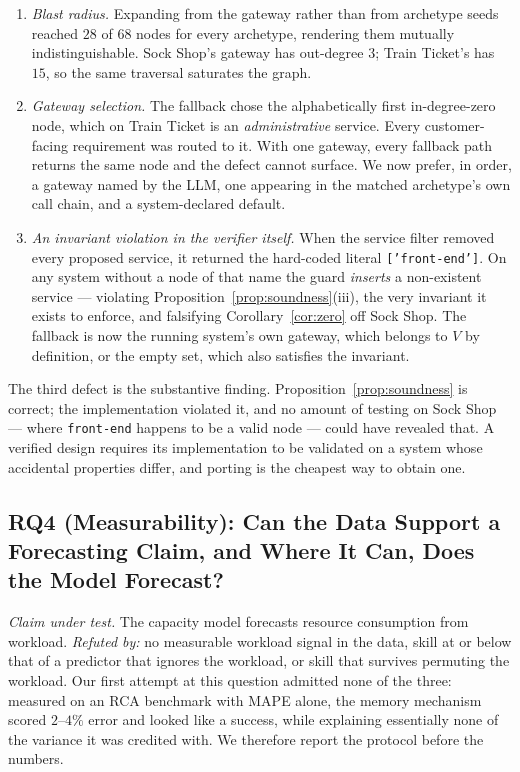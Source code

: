 \documentclass[journal, 10pt]{IEEEtran}
\begin{document}
\begin{enumerate}
    \item \emph{Blast radius.} Expanding from the gateway rather than from
    archetype seeds reached $28$ of $68$ nodes for every archetype, rendering
    them mutually indistinguishable. Sock Shop's gateway has out-degree $3$; Train
    Ticket's has $15$, so the same traversal saturates the graph.
    \item \emph{Gateway selection.} The fallback chose the alphabetically first
    in-degree-zero node, which on Train Ticket is an \emph{administrative}
    service. Every customer-facing requirement was routed to it. With one
    gateway, every fallback path returns the same node and the defect cannot
    surface. We now prefer, in order, a gateway named by the LLM, one appearing
    in the matched archetype's own call chain, and a system-declared default.
    \item \emph{An invariant violation in the verifier itself.} When the service
    filter removed every proposed service, it returned the hard-coded literal
    \texttt{['front-end']}. On any system without a node of that name the guard
    \emph{inserts} a non-existent service --- violating
    Proposition~\ref{prop:soundness}(iii), the very invariant it exists to
    enforce, and falsifying Corollary~\ref{cor:zero} off Sock Shop. The fallback
    is now the running system's own gateway, which belongs to $V$ by definition,
    or the empty set, which also satisfies the invariant.
\end{enumerate}

The third defect is the substantive finding. Proposition~\ref{prop:soundness}
is correct; the implementation violated it, and no amount of testing on Sock Shop
--- where \texttt{front-end} happens to be a valid node --- could have revealed
that. A verified design requires its implementation to be validated on a system
whose accidental properties differ, and porting is the cheapest way to obtain
one.


\subsection{RQ4 (Measurability): Can the Data Support a Forecasting Claim, and Where It Can, Does the Model Forecast?}
\label{sec:rq4}

\emph{Claim under test.} The capacity model forecasts resource consumption from
workload. \emph{Refuted by:} no measurable workload signal in the data, skill at
or below that of a predictor that ignores the workload, or skill that survives
permuting the workload. Our first attempt at this question admitted none of the
three: measured on an RCA
benchmark with MAPE alone, the memory mechanism scored $2$--$4\%$ error and
looked like a success, while explaining essentially none of the variance it was
credited with. We therefore report the protocol before the numbers.
\end{document}

